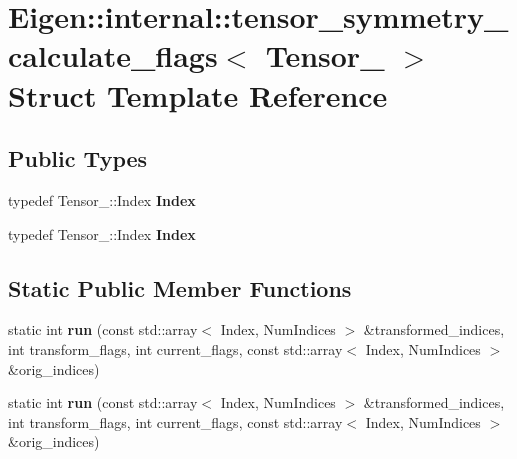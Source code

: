 \hypertarget{struct_eigen_1_1internal_1_1tensor__symmetry__calculate__flags}{}\section{Eigen\+:\+:internal\+:\+:tensor\+\_\+symmetry\+\_\+calculate\+\_\+flags$<$ Tensor\+\_\+ $>$ Struct Template Reference}
\label{struct_eigen_1_1internal_1_1tensor__symmetry__calculate__flags}
\subsection*{Public Types}
\begin{DoxyCompactItemize}
\item 
\mbox{\label{struct_eigen_1_1internal_1_1tensor__symmetry__calculate__flags_a8128fa0e39726f0d66be4df85c5621d5}} 
typedef Tensor\+\_\+\+::\+Index {\bfseries Index}
\item 
\mbox{\label{struct_eigen_1_1internal_1_1tensor__symmetry__calculate__flags_a8128fa0e39726f0d66be4df85c5621d5}} 
typedef Tensor\+\_\+\+::\+Index {\bfseries Index}
\end{DoxyCompactItemize}
\subsection*{Static Public Member Functions}
\begin{DoxyCompactItemize}
\item 
\mbox{\label{struct_eigen_1_1internal_1_1tensor__symmetry__calculate__flags_ac0d0dabba9e271ae71b0f4eb341f53f6}} 
static int {\bfseries run} (const std\+::array$<$ Index, Num\+Indices $>$ \&transformed\+\_\+indices, int transform\+\_\+flags, int current\+\_\+flags, const std\+::array$<$ Index, Num\+Indices $>$ \&orig\+\_\+indices)
\item 
\mbox{\label{struct_eigen_1_1internal_1_1tensor__symmetry__calculate__flags_ac0d0dabba9e271ae71b0f4eb341f53f6}} 
static int {\bfseries run} (const std\+::array$<$ Index, Num\+Indices $>$ \&transformed\+\_\+indices, int transform\+\_\+flags, int current\+\_\+flags, const std\+::array$<$ Index, Num\+Indices $>$ \&orig\+\_\+indices)
\end{DoxyCompactItemize}

